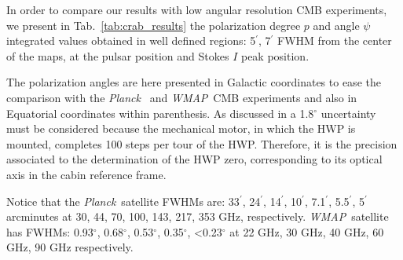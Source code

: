 \documentclass[twocolumn,traditabstract]{aa}
\def\Planck{\textit{Planck}}
\def\WMAP{\textit{WMAP}}
\begin{document}
In order to compare our results with low angular resolution CMB experiments, we present in Tab.~\ref{tab:crab_results} the
polarization degree $p$ and angle $\psi$ integrated values obtained in well
defined regions: 5$^\prime$, 7$^\prime$ FWHM from the center of the maps, at the pulsar position and Stokes $I$ peak position.


The polarization angles are here presented in Galactic coordinates to ease the comparison with the \Planck\ \citep{2015arXiv150702058P} and \WMAP\ CMB experiments \citep{2011ApJS..192...19W} and also in Equatorial coordinates within parenthesis.
As discussed in \cite{ritacco2017} a 1.8$^{\circ}$ uncertainty must be considered because the mechanical motor, in which the HWP is mounted, completes 100 steps per tour of the HWP. Therefore, it is the precision associated to the determination of the HWP zero, corresponding to its optical axis in the cabin reference frame.

Notice that the \Planck\ satellite FWHMs are: 33$^{\prime}$, 24$^{\prime}$, 14$^{\prime}$, 10$^{\prime}$, 7.1$^{\prime}$, 5.5$^{\prime}$, 5$^{\prime}$ arcminutes at 30, 44, 70, 100, 143, 217, 353 GHz, respectively.
\WMAP\ satellite has FWHMs: 0.93$^{\circ}$, 0.68$^{\circ}$, 0.53$^{\circ}$, 0.35$^{\circ}$, \textless 0.23$^{\circ}$ at 22 GHz, 30 GHz, 40 GHz, 60 GHz, 90 GHz respectively. 

\end{document}
